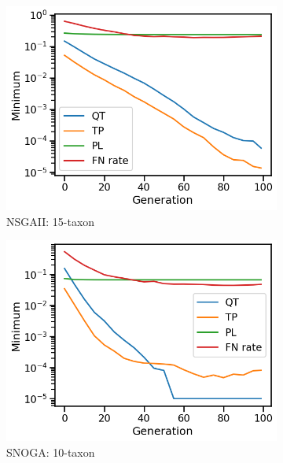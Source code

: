 \begin{figure}[!h]
\begin{subfigure}[b]{0.33\textwidth}
			\includegraphics[width=\textwidth]{Figure/15-taxon_NSGAII_minimum}
			\caption{NSGAII: 15-taxon}
\end{subfigure}
		\begin{subfigure}[b]{0.33\textwidth}
			\includegraphics[width=\textwidth]{Figure/10-taxon_NOSSGA_minimum}
			\caption{SNOGA: 10-taxon}
\end{subfigure}\begin{subfigure}[b]{0.33\textwidth}

\end{subfigure}
\end{figure}
